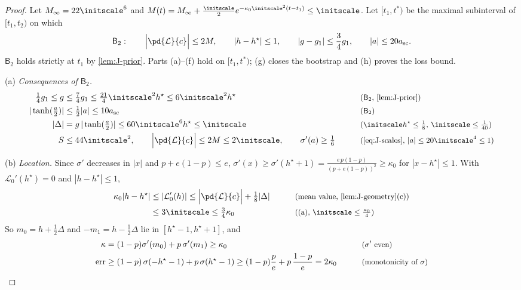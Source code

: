 \begin{proof}
Let $M_\infty=22\initscale^6$ and $M(t)=M_\infty+\frac{\initscale}{2}e^{-\kappa_0\initscale^2(t-t_1)}\le\initscale$. Let $[t_1,t^\ast)$ be the maximal subinterval of
$[t_1,t_2)$ on which
\[
 \mathsf B_2:\qquad \Bigl|\pd{\mathcal L}{c}\Bigr|\le2M,\qquad |h-h^\star|\le1,\qquad |g-g_1|\le\frac{3}{4}g_1,\qquad |a|\le20a_{\mathrm{sc}} .
\]
$\mathsf B_2$ holds strictly at $t_1$ by \cref{lem:J-prior}. Parts (a)--(f) hold on $[t_1,t^\ast)$; (g) closes the bootstrap and (h) proves the loss bound.

\smallskip\noindent(a) \emph{Consequences of $\mathsf B_2$.}
\begin{alignat*}{2}
 \tfrac{1}{4}g_1\le g&\le\tfrac{7}{4}g_1\le\tfrac{21}{4}\initscale^2h^\star\le6\initscale^2h^\star &\qquad& \why{$\mathsf B_2$, \cref{lem:J-prior}}\\
 |\tanh(\tfrac{a}{2})|&\le\tfrac{1}{2}|a|\le10a_{\mathrm{sc}} && \why{$\mathsf B_2$}\\
 |\Delta|&=g\,|\tanh(\tfrac{a}{2})|\le60\initscale^6h^\star\le\initscale && \why{$\initscale h^\star\le\tfrac{1}{8}$, $\initscale\le\tfrac{1}{40}$}\\
 S&\le44\initscale^2,\qquad \Bigl|\pd{\mathcal L}{c}\Bigr|\le2M\le2\initscale,\qquad \sigma'(a)\ge\tfrac{1}{6} && \why{\cref{eq:J-scales}, $|a|\le20\initscale^4\le1$}
\end{alignat*}

\noindent(b) \emph{Location.} Since $\sigma'$ decreases in $|x|$ and $p+e(1-p)\le e$, $\sigma'(x)\ge\sigma'(h^\star+1)=\frac{e\,p(1-p)}{(p+e(1-p))^2}\ge\kappa_0$
for $|x-h^\star|\le1$. With $\mathcal L_0'(h^\star)=0$ and $|h-h^\star|\le1$,
\begin{alignat*}{2}
 \kappa_0|h-h^\star|&\le|\mathcal L_0'(h)|\le\Bigl|\pd{\mathcal L}{c}\Bigr|+\tfrac{1}{8}|\Delta| &\qquad& \why{mean value, \cref{lem:J-geometry}(c)}\\
 &\le3\initscale\le\tfrac{3}{4}\kappa_0 && \why{(a), $\initscale\le\tfrac{\kappa_0}{4}$}
\end{alignat*}
So $m_0=h+\frac{1}{2}\Delta$ and $-m_1=h-\frac{1}{2}\Delta$ lie in $[h^\star-1,h^\star+1]$, and
\begin{alignat*}{2}
 \kappa&=(1-p)\sigma'(m_0)+p\,\sigma'(m_1)\ge\kappa_0 &\qquad& \text{\small($\sigma'$ even)}\\
 \mathrm{err}&\ge(1-p)\,\sigma(-h^\star-1)+p\,\sigma(h^\star-1)\ge(1-p)\frac{p}{e}+p\,\frac{1-p}{e}=2\kappa_0 && \text{\small(monotonicity of $\sigma$)}
\end{alignat*}


\end{proof}
